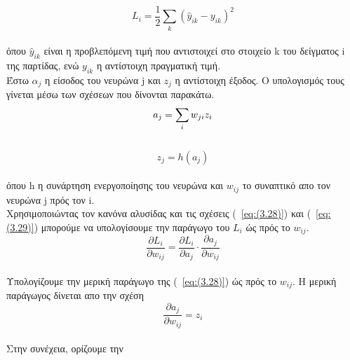 \documentclass[12pt]{article}
\numberwithin{equation}{section}
\begin{document}
\begin{equation}
L_i = \frac{1}{2} \sum_k (\hat{y}_{ik} - y_{ik})^2
\label{eq:μέσο τετραγωνικό σφάλμα}
\end{equation}\\

\noindent όπου \(\hat{y}_{ik}\) είναι η προβλεπόμενη τιμή που αντιστοιχεί στο στοιχείο k του δείγματος i της παρτίδας, ενώ \(y_{ik}\) η αντίστοιχη πραγματική τιμή.\\

\noindent Έστω \(\alpha_j\) η είσοδος του νευρώνα j και \(z_j\) η αντίστοιχη έξοδος. Ο υπολογισμός τους γίνεται μέσω των σχέσεων που δίνονται παρακάτω.\\

\begin{equation}
a_j = \sum_i w_{ji} z_i \\
\label{eq:(3.28)}
\end{equation}\\

\begin{equation}
z_j = h(a_j)
\label{eq:(3.29)}
\end{equation}\\

\noindent όπου h η συνάρτηση ενεργοποίησης του νευρώνα και \(w_{ij}\) το συναπτικό απο τον νευρώνα j πρός τον i.\\

\noindent Χρησιμοποιώντας τον κανόνα αλυσίδας και τις σχέσεις (~\ref{eq:(3.28)}) και (~\ref{eq:(3.29)}) μπορούμε να υπολογίσουμε την παράγωγο του \(L_i\) ώς πρός το \(w_{ij}\). \\



\begin{equation}
\frac{\partial L_i}{\partial w_{ij}} = \frac{\partial L_i}{\partial a_j} \cdot \frac{\partial a_j}{\partial w_{ij}}
\end{equation}\\

\noindent Υπολογίζουμε την μερική παράγωγο της (~\ref{eq:(3.28)}) ώς πρός το \(w_{ij}\). Η μερική παράγωγος δίνεται απο την σχέση\\

\begin{equation}
\frac{\partial a_j}{\partial w_{ij}} = z_i
\end{equation}\\

\noindent Στην συνέχεια, ορίζουμε την\\
\end{document}
